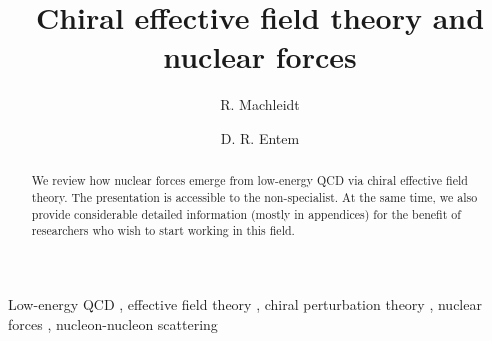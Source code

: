 \documentclass[sort&compress,preprint,3p]{elsarticle}
\begin{document}
\begin{frontmatter}




\title{\bf Chiral effective field theory and nuclear forces}


\author[Idaho]{R. Machleidt}
\author[Salamanca]{D. R. Entem}

\address[Idaho]{Department of Physics, University of Idaho, 
Moscow, Idaho 83844, USA}
\address[Salamanca]{Grupo de Fisica Nuclear and IUFFyM, University of Salamanca, 
E-37008 Salamanca, Spain}


\begin{abstract}
We review how nuclear forces emerge from low-energy QCD via chiral
effective field theory. The presentation is accessible to the non-specialist.
At the same time, we also provide considerable detailed information
(mostly in appendices)
for the benefit of researchers who wish to
start working in this field.
\end{abstract}

\begin{keyword}

Low-energy QCD \sep 
effective field theory \sep
chiral perturbation theory \sep
nuclear forces \sep
nucleon-nucleon scattering



\end{keyword}

\end{frontmatter}
\end{document}
